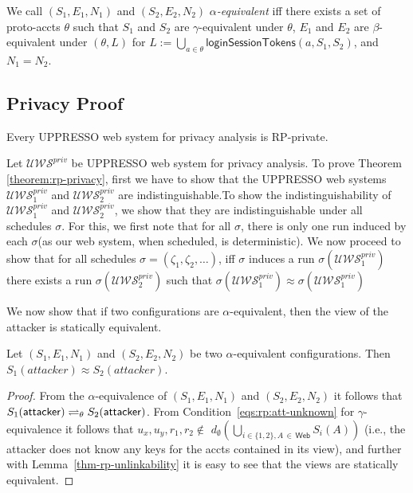   \begin{definition}
    We call $(S_1,E_1,N_1)$ and $(S_2,E_2,N_2)$
    \emph{$\alpha$-equivalent} iff there exists a set of 
    proto-accts $\theta$ such that $S_1$ and $S_2$ are
    $\gamma$-equivalent under $\theta$, $E_1$ and $E_2$ are
    $\beta$-equivalent under $(\theta,L)$ 
    for $L := \bigcup_{a\in\theta} \mathsf{loginSessionTokens}(a,S_1,S_2)$, 
    and $N_1 = N_2$.
  \end{definition}
  
  \subsection{Privacy Proof}
  
  \begin{theorem} \label{theorem:rp-privacy}
    Every UPPRESSO web system for privacy analysis is RP-private.
  \end{theorem}
  
  \newc
  Let $\mathcal{U\!W\!S}^{priv}$ be UPPRESSO web system for privacy analysis.
  To prove Theorem \ref{theorem:rp-privacy}, first we have to show that 
  the UPPRESSO web systems $\mathcal{U\!W\!S}^{priv}_1$ and 
  $\mathcal{U\!W\!S}^{priv}_2$ are indistinguishable.\oldc To show 
  the indistinguishability of $\mathcal{U\!W\!S}^{priv}_1$ and 
  $\mathcal{U\!W\!S}^{priv}_2$, we show that they are 
  indistinguishable under all schedules $\sigma$. For this, 
  we first note that for all $\sigma$, there is only one run 
  induced by each $\sigma$(as our web system, when scheduled, is deterministic).
  We now proceed to show that for all schedules $\sigma=(\zeta _1, \zeta_2,\dots)$, 
  iff $\sigma$ induces a run $\sigma(\mathcal{U\!W\!S}^{priv}_1)$ 
  there exists a run $\sigma(\mathcal{U\!W\!S}^{priv}_2)$ 
  such that $\sigma(\mathcal{U\!W\!S}^{priv}_1)\approx\sigma(\mathcal{U\!W\!S}^{priv}_1)$
  
  We now show that if two configurations are $\alpha$-equivalent, 
  then the view of the attacker is statically equivalent.
  
  \begin{lemma}\label{lemma:statically-equivalent}
    Let $(S_1,E_1,N_1)$ and $(S_2,E_2,N_2)$ be two 
    $\alpha$-equivalent configurations. 
    Then $S_1(attacker)\approx S_2(attacker)$.
  \end{lemma}
  \begin{proof}
    From the $\alpha$-equivalence of $(S_1,E_1,N_1)$ and 
    $(S_2,E_2,N_2)$ it follows that $S_1(\mathsf{attacker}) 
    \rightleftharpoons_{\theta} S_2(\mathsf{attacker})$.
    From Condition~\ref{eqs:rp:att-unknown} for 
    $\gamma$-equivalence it follows that
    $u_x, u_y, r_1, r_2 \not\in $
    $d_\emptyset(\bigcup_{i\in\{1,2\},A\,\in\,\mathsf{Web}}S_i(A))$ 
    (i.e., the attacker does not know any keys for the accts 
    contained in its view), and further with Lemma~\ref{thm-rp-unlinkability} 
    it is easy to see that the views are statically equivalent.
  \end{proof}

